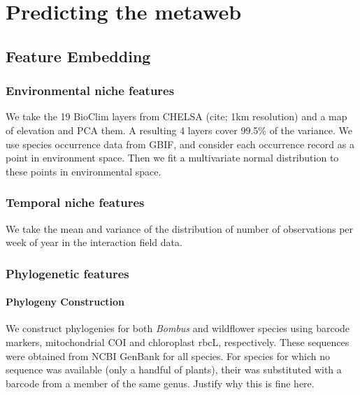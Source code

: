 \documentclass[11pt]{article}
\begin{document}
\hypertarget{predicting-the-metaweb}{%
\section{Predicting the metaweb}\label{predicting-the-metaweb}}

\hypertarget{feature-embedding}{%
\subsection{Feature Embedding}\label{feature-embedding}}

\hypertarget{environmental-niche-features}{%
\subsubsection{Environmental niche
features}\label{environmental-niche-features}}

We take the 19 BioClim layers from CHELSA (cite; 1km resolution) and a
map of elevation and PCA them. A resulting 4 layers cover 99.5\% of the
variance. We use species occurrence data from GBIF, and consider each
occurrence record as a point in environment space. Then we fit a
multivariate normal distribution to these points in environmental space.

\hypertarget{temporal-niche-features}{%
\subsubsection{Temporal niche features}\label{temporal-niche-features}}

We take the mean and variance of the distribution of number of
observations per week of year in the interaction field data.

\hypertarget{phylogenetic-features}{%
\subsubsection{Phylogenetic features}\label{phylogenetic-features}}

\hypertarget{phylogeny-construction}{%
\paragraph{Phylogeny Construction}\label{phylogeny-construction}}

We construct phylogenies for both \emph{Bombus} and wildflower species
using barcode markers, mitochondrial COI and chloroplast rbcL,
respectively. These sequences were obtained from NCBI GenBank for all
species. For species for which no sequence was available (only a handful
of plants), their was substituted with a barcode from a member of the
same genus. Justify why this is fine here.
\end{document}
